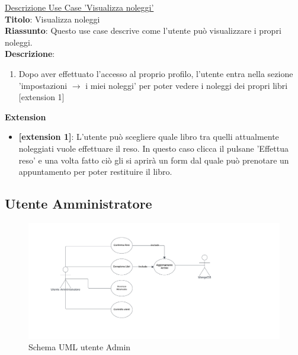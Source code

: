 \documentclass{article}
\begin{document}
 \noindent\underline{Descrizione Use Case 'Visualizza noleggi'}\\
    \textbf{Titolo}: Visualizza noleggi\\
    \textbf{Riassunto}: Questo use case descrive come l'utente può visualizzare i propri noleggi.\\
    \textbf{Descrizione}: 
    \begin{enumerate}
        \item Dopo aver effettuato l'accesso al proprio profilo, l'utente entra nella sezione 'impostazioni $\rightarrow$ i miei noleggi' per poter vedere i noleggi dei propri libri [extension 1]
    \end{enumerate}
    \textbf{Extension}
    \begin{itemize}
        \item \textbf{[extension 1]}: L'utente può scegliere quale libro tra quelli attualmente noleggiati vuole effettuare il reso. In questo caso clicca il pulsane 'Effettua reso' e una volta fatto ciò gli si aprirà un form dal quale può prenotare un appuntamento per poter restituire il libro.
    \end{itemize}

    \subsection{Utente Amministratore}
    \begin{figure}[H]
    \centering
    \includegraphics[width=130mm]{D2/Images/Ut_Admin.png}
    \caption{Schema UML utente Admin}
\end{figure}
\end{document}
